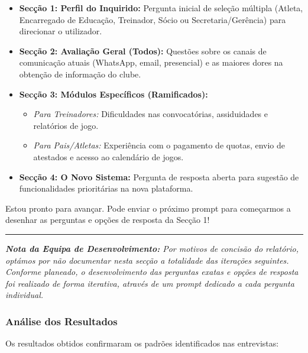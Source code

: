 \documentclass[a4paper,12pt]{scrreprt}
\begin{document}
{{\begin{itemize}
    \item \textbf{Secção 1: Perfil do Inquirido:} Pergunta inicial de seleção múltipla (Atleta, Encarregado de Educação, Treinador, Sócio ou Secretaria/Gerência) para direcionar o utilizador.
    \item \textbf{Secção 2: Avaliação Geral (Todos):} Questões sobre os canais de comunicação atuais (WhatsApp, email, presencial) e as maiores dores na obtenção de informação do clube.
    \item \textbf{Secção 3: Módulos Específicos (Ramificados):}
    \begin{itemize}
        \item \textit{Para Treinadores:} Dificuldades nas convocatórias, assiduidades e relatórios de jogo.
        \item \textit{Para Pais/Atletas:} Experiência com o pagamento de quotas, envio de atestados e acesso ao calendário de jogos.
    \end{itemize}
    \item \textbf{Secção 4: O Novo Sistema:} Pergunta de resposta aberta para sugestão de funcionalidades prioritárias na nova plataforma.
\end{itemize}

Estou pronto para avançar. Pode enviar o próximo prompt para começarmos a desenhar as perguntas e opções de resposta da Secção 1!

\vspace{0.3cm}
\hrule
\vspace{0.2cm}
\textit{\textbf{Nota da Equipa de Desenvolvimento:} Por motivos de concisão do relatório, optámos por não documentar nesta secção a totalidade das iterações seguintes. Conforme planeado, o desenvolvimento das perguntas exatas e opções de resposta foi realizado de forma iterativa, através de um \textit{prompt} dedicado a cada pergunta individual. }}



\subsubsection{Análise dos Resultados}

Os resultados obtidos confirmaram os padrões identificados nas entrevistas:

}
\end{document}
